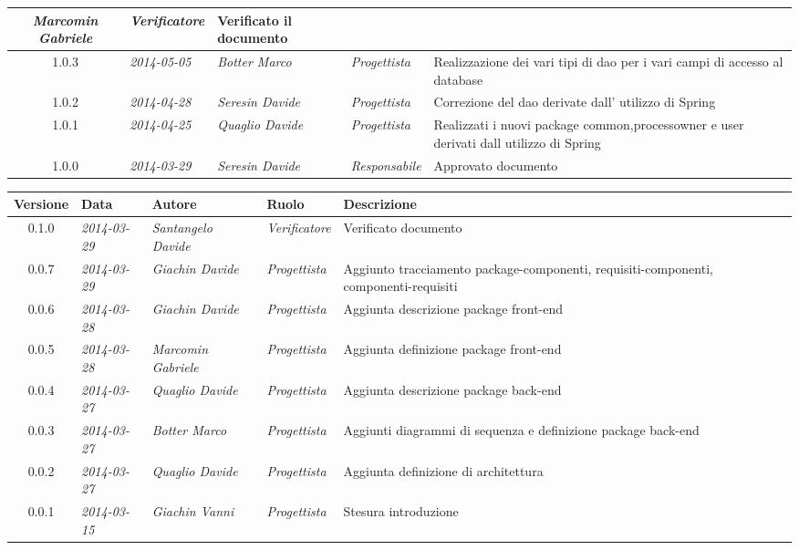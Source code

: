 \begin{small}
\begin{tabular}{|c|p{1.8cm}|p{2.8cm}|p{2.8cm}|p{3.5cm}|}
\textit{Marcomin Gabriele} &
\textit{Verificatore} & Verificato il documento\\
\hline
1.0.3 & \textit{2014-05-05} & 
\textit{Botter Marco} &
\textit{Progettista} & Realizzazione dei vari tipi di dao per i vari campi di accesso al database\\
\hline
1.0.2 & \textit{2014-04-28} & 
\textit{Seresin Davide} &
\textit{Progettista} & Correzione del dao derivate dall' utilizzo di Spring\\
\hline
1.0.1 & \textit{2014-04-25} & 
\textit{Quaglio Davide} &
\textit{Progettista} &Realizzati i nuovi package common,processowner e user derivati dall utilizzo di Spring\\
\hline
1.0.0 & \textit{2014-03-29} & 
\textit{Seresin Davide} &
\textit{Responsabile} &Approvato documento\\
\hline
\end{tabular}

\begin{tabular}{|c|p{1.8cm}|p{2.8cm}|p{2.8cm}|p{3.5cm}|}
\hline
Versione & Data & Autore & Ruolo & Descrizione \\
\hline
0.1.0 & \textit{2014-03-29} & 
\textit{Santangelo Davide} &
\textit{Verificatore} &Verificato documento\\
\hline
0.0.7 & \textit{2014-03-29} & 
\textit{Giachin Davide} &
\textit{Progettista} & Aggiunto tracciamento package-componenti, requisiti-componenti, componenti-requisiti\\
\hline
0.0.6 & \textit{2014-03-28} & 
\textit{Giachin Davide} &
\textit{Progettista} & Aggiunta descrizione package front-end\\
\hline
0.0.5 & \textit{2014-03-28} & 
\textit{Marcomin Gabriele} &
\textit{Progettista} & Aggiunta definizione package front-end\\
\hline
0.0.4 & \textit{2014-03-27} & 
\textit{Quaglio Davide} &
\textit{Progettista} & Aggiunta descrizione package back-end\\
\hline
0.0.3 & \textit{2014-03-27} & 
\textit{Botter Marco} &
\textit{Progettista} & Aggiunti diagrammi di sequenza e definizione package back-end\\
\hline
0.0.2 & \textit{2014-03-27} & 
\textit{Quaglio Davide} &
\textit{Progettista} & Aggiunta definizione di architettura \\
\hline
0.0.1 & \textit{2014-03-15} & 
\textit{Giachin Vanni} &
\textit{Progettista} & Stesura introduzione\\
\hline
\end{tabular}\\
\end{small}